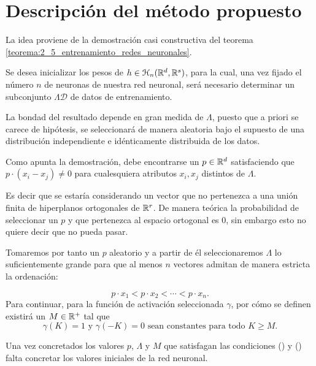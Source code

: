 \section{Descripción del método propuesto}
\label{ch07:algoritmo-propuesto}
\begin{aportacionOriginal} %
    
La idea proviene de la demostración casi constructiva del teorema \ref{teorema:2_5_entrenamiento_redes_neuronales}.

Se desea inicializar los pesos de $h \in \mathcal{H}_n(\mathbb{R}^d,\mathbb{R}^s)$, para la cual, una vez fijado el número $n$ de neuronas de nuestra red neuronal, será necesario  determinar un subconjunto $\Lambda \mathcal{D}$ de datos de entrenamiento. 

La bondad del resultado depende en gran medida de $\Lambda$, 
puesto que a priori se carece de hipótesis, se seleccionará 
de manera aleatoria bajo el supuesto de una distribución 
independiente e idénticamente distribuida de los datos. 

Como apunta la demostración, debe encontrarse un 
$p \in \mathbb{R}^d$ satisfaciendo que $p \cdot (x_i-x_j) \neq 0$ para cualesquiera
atributos $x_i,x_j$ distintos de $\Lambda$.  

Es decir que se estaría considerando un vector que no 
pertenezca a una unión finita de hiperplanos ortogonales de $\mathbb{R}^r$. 
De manera teórica la probabilidad de seleccionar un $p$ y 
que pertenezca al espacio ortogonal es $0$, sin embargo esto 
no quiere decir que no pueda pasar. 

Tomaremos por tanto un $p$ aleatorio y a partir de él 
seleccionaremos $\Lambda$ lo suficientemente grande para que
 al menos $n$ vectores admitan de manera estricta la ordenación: 

\begin{equation}\label{eq:method_inicializar_condition_desigualdad}
    p \cdot x_1 < 
    p \cdot x_2 
    < \cdots <
    p \cdot x_n.
\end{equation}
Para continuar, para la función de activación 
seleccionada $\gamma$, por cómo se definen 
existirá un $M \in \mathbb{R}^+$ tal que 
\begin{equation} \label{eq:method_inicializar_M}
    \gamma(K)=1 \text{ y } \gamma(-K)=0 
    \text{ sean constantes para todo }K \geq M.
\end{equation}

Una vez concretados los valores $p$, $\Lambda$ y $M$ que satisfagan las condiciones 
() 
y ()  
falta concretar los valores iniciales de la red neuronal. 


\end{aportacionOriginal}
